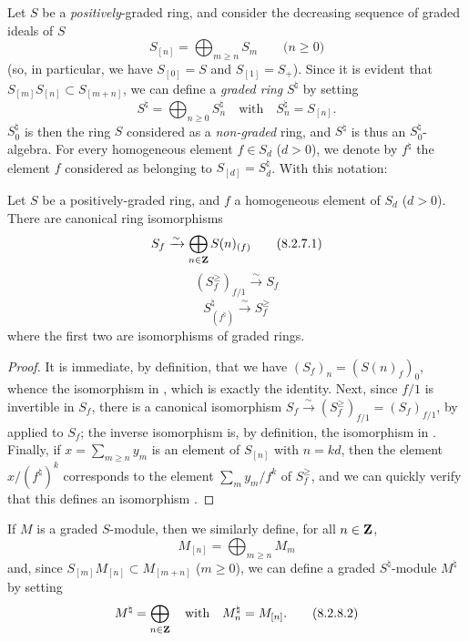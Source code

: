 \begin{env}[8.2.6]
\label{II.8.2.6}
Let $S$ be a \emph{positively}-graded ring, and consider the decreasing sequence of graded ideals of $S$
\[
\label{II.8.2.6.1}
  S_{[n]} = \bigoplus_{m\geq n} S_m
  \qquad\mbox{($n\geq0$)}
\tag{8.2.6.1}
\]
(so, in particular, we have $S_{[0]}=S$ and $S_{[1]}=S_+$).
Since it is evident that $S_{[m]}S_{[n]} \subset S_{[m+n]}$, we can define a \emph{graded ring} $S^\natural$ by setting
\[
\label{II.8.2.6.2}
  S^\natural = \bigoplus_{n\geq0} S_n^\natural
  \quad
  \text{with}
  \quad
  S_n^\natural = S_{[n]}.
\tag{8.2.6.2}
\]
$S_0^\natural$ is then the ring $S$ considered as a \emph{non-graded} ring, and $S^\natural$ is thus an $S_0^\natural$-algebra.
For every homogeneous element $f\in S_d$ ($d>0$), we denote by $f^\natural$ the element $f$ considered as belonging to $S_{[d]} = S_d^\natural$.
With this notation:
\end{env}

\begin{lemma}[8.2.7]
\label{II.8.2.7}
Let $S$ be a positively-graded ring, and $f$ a homogeneous element of $S_d$ ($d>0$).
There are canonical ring isomorphisms
\[
\label{II.8.2.7.1}
  S_f \xrightarrow{\sim} \bigoplus_{n\in\mathbf{Z}} S(n)_{(f)}
\tag{8.2.7.1}
\]
\[
\label{II.8.2.7.2}
  (S_f^\geq)_{f/1} \xrightarrow{\sim} S_f
\tag{8.2.7.2}
\]
\[
\label{II.8.2.7.3}
  S_{(f^\natural)}^\natural \xrightarrow{\sim} S_f^\geq
\tag{8.2.7.3}
\]
where the first two are isomorphisms of graded rings.
\end{lemma}

\begin{proof}
It is immediate, by definition, that we have $(S_f)_n = (S(n)_f)_0$, whence the isomorphism in , which is exactly the identity.
Next, since $f/1$ is invertible in $S_f$, there is a canonical isomorphism $S_f \xrightarrow{\sim} (S_f^\geq)_{f/1} = (S_f)_{f/1}$, by  applied to $S_f$;
the inverse isomorphism is, by definition, the isomorphism in .
Finally, if $x = \sum_{m\geq n}y_m$ is an element of $S_{[n]}$ with $n=kd$, then the element $x/(f^\natural)^k$ corresponds to the element $\sum_m y_m/f^k$ of $S_f^\geq$, and we can quickly verify that this defines an isomorphism .
\end{proof}

\begin{env}[8.2.8]
\label{II.8.2.8}
If $M$ is a graded $S$-module, then we similarly define, for all $n\in\mathbf{Z}$,
\[
\label{II.8.2.8.1}
  M_{[n]} = \bigoplus_{m\geq n} M_m
\tag{8.2.8.1}
\]
and, since $S_{[m]}M_{[n]} \subset M_{[m+n]}$ ($m\geq0$), we can define a graded $S^\natural$-module $M^\natural$ by setting
\[
\label{II.8.2.8.2}
  M^\natural = \bigoplus_{n\in\mathbf{Z}}
  \quad
  \text{with}
  \quad
  M_n^\natural = M_{[n]}.
\tag{8.2.8.2}
\]
\end{env}

